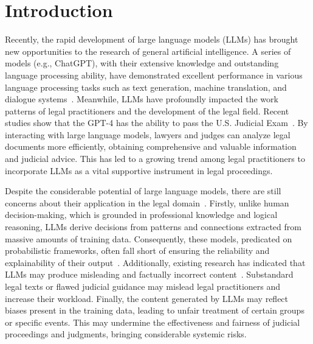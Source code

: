 \section{Introduction}
\label{intro}
Recently, the rapid development of large language models (LLMs) has brought new opportunities to the research of general artificial intelligence. A series of models (e.g., ChatGPT), with their extensive knowledge and outstanding language processing ability, have demonstrated excellent performance in various language processing tasks such as text generation, machine translation, and dialogue systems~\cite{Flant5,gpt3,chen2021evaluating,wei2022chain,peng2023instruction}.
Meanwhile, LLMs have profoundly impacted the work patterns of legal practitioners and the development of the legal field. Recent studies show that the GPT-4 has the ability to pass the U.S. Judicial Exam~\cite{gptbar}.
By interacting with large language models, lawyers and judges can analyze legal documents more efficiently, obtaining comprehensive and valuable information and judicial advice. This has led to a growing trend among legal practitioners to incorporate LLMs as a vital supportive instrument in legal proceedings\cite{cui2023chatlaw,Sailer,li2024deltapretraindiscriminativeencoder}.

Despite the considerable potential of large language models, there are still concerns about their application in the legal domain~\cite{savelka2023gpt4,nay2023large,li2024bladeenhancingblackboxlarge}. Firstly, unlike human decision-making, which is grounded in professional knowledge and logical reasoning, LLMs derive decisions from patterns and connections extracted from massive amounts of training data. Consequently, these models, predicated on probabilistic frameworks, often fall short of ensuring the reliability and explainability of their output~\cite{floridi2020gpt}. 
Additionally, existing research has indicated that LLMs may produce misleading and factually incorrect content~\cite{manakul2023selfcheckgpt}. Substandard legal texts or flawed judicial guidance may mislead legal practitioners and increase their workload. Finally, the content generated by LLMs may reflect biases present in the training data, leading to unfair treatment of certain groups or specific events. This may undermine the effectiveness and fairness of judicial proceedings and judgments, bringing considerable systemic risks.


